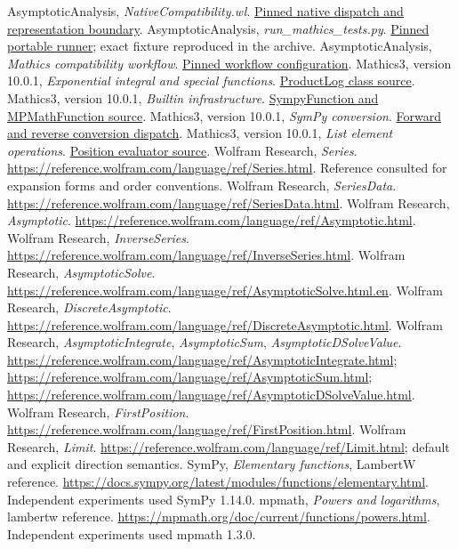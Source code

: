 \documentclass[11pt,a4paper]{article}
\newcommand{\src}[2]{\href{https://github.com/VladimirReshetnikov/Asymptotic/blob/7d1bc832895cc90a9b2a978b7b7684acab908bd2/#1}{#2}}
\newcommand{\mics}[2]{\href{https://github.com/Mathics3/mathics-core/blob/10.0.1/#1}{#2}}
\begin{document}
\begin{thebibliography}{99}
 AsymptoticAnalysis, \emph{NativeCompatibility.wl}. \src{src/Kernel/NativeCompatibility.wl}{Pinned native dispatch and representation boundary}.
 AsymptoticAnalysis, \emph{run\_mathics\_tests.py}. \src{validation/run_mathics_tests.py}{Pinned portable runner}; exact fixture reproduced in the archive.
 AsymptoticAnalysis, \emph{Mathics compatibility workflow}. \src{.github/workflows/mathics.yml}{Pinned workflow configuration}.
 Mathics3, version 10.0.1, \emph{Exponential integral and special functions}. \mics{mathics/builtin/specialfns/expintegral.py}{ProductLog class source}.
 Mathics3, version 10.0.1, \emph{Builtin infrastructure}. \mics{mathics/core/builtin.py}{SympyFunction and MPMathFunction source}.
 Mathics3, version 10.0.1, \emph{SymPy conversion}. \mics{mathics/core/convert/sympy.py}{Forward and reverse conversion dispatch}.
 Mathics3, version 10.0.1, \emph{List element operations}. \mics{mathics/builtin/list/eol.py}{Position evaluator source}.
 Wolfram Research, \emph{Series}. \url{https://reference.wolfram.com/language/ref/Series.html}. Reference consulted for expansion forms and order conventions.
 Wolfram Research, \emph{SeriesData}. \url{https://reference.wolfram.com/language/ref/SeriesData.html}.
 Wolfram Research, \emph{Asymptotic}. \url{https://reference.wolfram.com/language/ref/Asymptotic.html}.
 Wolfram Research, \emph{InverseSeries}. \url{https://reference.wolfram.com/language/ref/InverseSeries.html}.
 Wolfram Research, \emph{AsymptoticSolve}. \url{https://reference.wolfram.com/language/ref/AsymptoticSolve.html.en}.
 Wolfram Research, \emph{DiscreteAsymptotic}. \url{https://reference.wolfram.com/language/ref/DiscreteAsymptotic.html}.
 Wolfram Research, \emph{AsymptoticIntegrate}, \emph{AsymptoticSum}, \emph{AsymptoticDSolveValue}. \url{https://reference.wolfram.com/language/ref/AsymptoticIntegrate.html}; \url{https://reference.wolfram.com/language/ref/AsymptoticSum.html}; \url{https://reference.wolfram.com/language/ref/AsymptoticDSolveValue.html}.
 Wolfram Research, \emph{FirstPosition}. \url{https://reference.wolfram.com/language/ref/FirstPosition.html}.
 Wolfram Research, \emph{Limit}. \url{https://reference.wolfram.com/language/ref/Limit.html}; default and explicit direction semantics.
 SymPy, \emph{Elementary functions}, LambertW reference. \url{https://docs.sympy.org/latest/modules/functions/elementary.html}. Independent experiments used SymPy 1.14.0.
 mpmath, \emph{Powers and logarithms}, lambertw reference. \url{https://mpmath.org/doc/current/functions/powers.html}. Independent experiments used mpmath 1.3.0.
\end{thebibliography}
\end{document}
